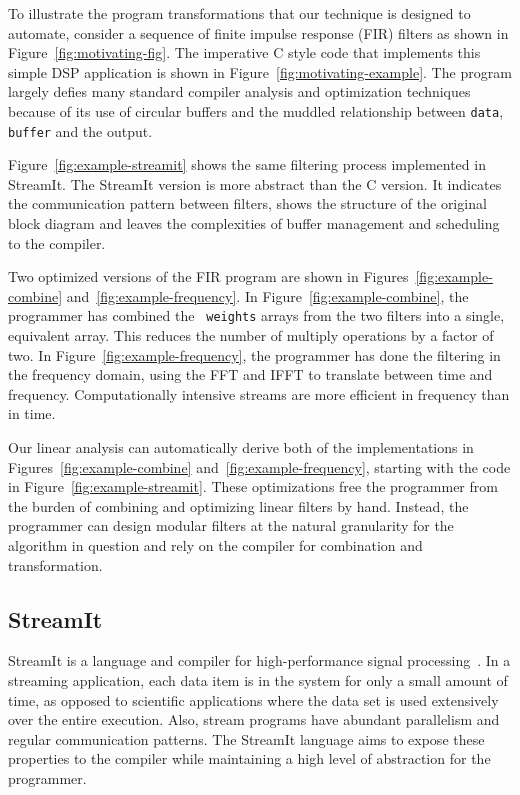 To illustrate the program transformations that our technique is
designed to automate, consider a sequence of finite impulse response
(FIR) filters as shown in Figure~\ref{fig:motivating-fig}. The
imperative C style code that implements this simple DSP application is
shown in Figure~\ref{fig:motivating-example}. 
The program largely defies many standard compiler analysis
and optimization techniques because of its use of circular buffers and
the muddled relationship between {\tt data}, {\tt buffer} and the
output.

Figure~\ref{fig:example-streamit} shows the same filtering process
implemented in StreamIt. The StreamIt version is more abstract than
the C version.  It indicates the communication pattern between
filters, shows the structure of the original block diagram and leaves
the complexities of buffer management and scheduling to the compiler.

Two optimized versions of the FIR program are shown in
Figures~\ref{fig:example-combine} and~\ref{fig:example-frequency}.  In
Figure~\ref{fig:example-combine}, the programmer has combined the {\tt
weights} arrays from the two filters into a single, equivalent array.
This reduces the number of multiply operations by a factor of two.  In
Figure~\ref{fig:example-frequency}, the programmer has done the
filtering in the frequency domain, using the FFT and IFFT to translate
between time and frequency.  Computationally intensive streams are
more efficient in frequency than in time.

Our linear analysis can automatically derive both of the
implementations in Figures~\ref{fig:example-combine}
and~\ref{fig:example-frequency}, starting with the code in
Figure~\ref{fig:example-streamit}.  These optimizations free the
programmer from the burden of combining and optimizing linear filters
by hand.  Instead, the programmer can design modular filters at the
natural granularity for the algorithm in question and rely on the
compiler for combination and transformation.

\subsection{StreamIt}

StreamIt is a language and compiler for high-performance signal
processing~\cite{gordon-thesis,streamit-asplos,streamitcc}.  In a
streaming application, each data item is in the system for only a
small amount of time, as opposed to scientific applications where the
data set is used extensively over the entire execution.  Also, stream
programs have abundant parallelism and regular communication patterns.
The StreamIt language aims to expose these properties to the compiler
while maintaining a high level of abstraction for the programmer.

